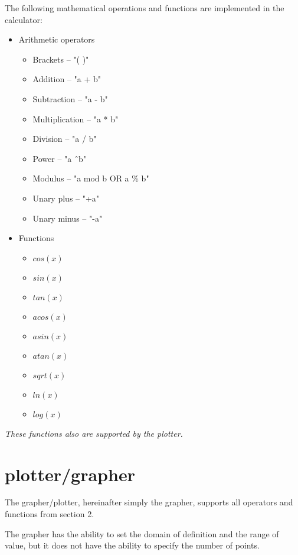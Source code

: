 \documentclass[12pt, a4paper]{article}
\begin{document}
The following mathematical operations and functions are implemented in the calculator:
  \begin{itemize}
    \item Arithmetic operators
    \begin{itemize}
      \item Brackets -- "( )"
      \item Addition -- "a + b"
      \item Subtraction -- "a - b"
      \item Multiplication -- "a * b"
      \item Division -- "a / b"
      \item Power -- "a \^\ b"
      \item Modulus -- "a mod b OR a \% b"
      \item Unary plus -- "+a"
      \item Unary minus -- "-a"
    \end{itemize}
    \item Functions
    \begin{itemize}
      \item $cos(x)$
      \item $sin(x)$
      \item $tan(x)$
      \item $acos(x)$
      \item $asin(x)$
      \item $atan(x)$
      \item $sqrt(x)$
      \item $ln(x)$
      \item $log(x)$
    \end{itemize}
  \end{itemize}

\textit{These functions also are supported by the plotter.}

\pagebreak

\section{plotter/grapher}

The grapher/plotter, hereinafter simply the grapher, supports all operators and functions from section 2.

The grapher has the ability to set the domain of definition and the range of value, but it does not have the ability to specify the number of points.
\end{document}
